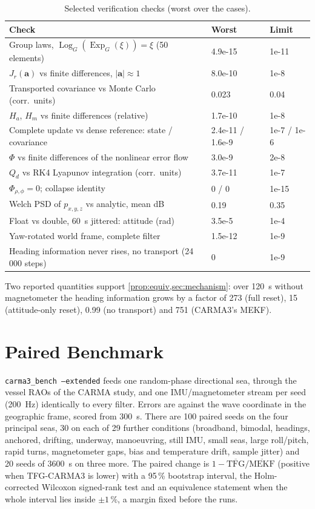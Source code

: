 \documentclass[conference]{IEEEtran}
\DeclareMathOperator{\Exp}{Exp}
\DeclareMathOperator{\Log}{Log}
\theoremstyle{bodysmall}
\begin{document}
\begin{table}[t]
  \centering
  \caption{Selected verification checks (worst over the cases).}
  \label{tab:verify}
  \footnotesize
  \setlength{\tabcolsep}{3pt}
  \begin{tabular}{@{}p{}ll@{}}
    \toprule
    Check & Worst & Limit\\
    \midrule
    Group laws, $\Log_G(\Exp_G(\xi))=\xi$ (50 elements) & 4.9e-15 & 1e-11\\
    $J_r(\mathbf a)$ vs finite differences, $|\mathbf a|\approx1$ & 8.0e-10 & 1e-8\\
    Transported covariance vs Monte Carlo (corr.\ units) & 0.023 & 0.04\\
    $H_a$, $H_m$ vs finite differences (relative) & 1.7e-10 & 1e-8\\
    Complete update vs dense reference: state / covariance & 2.4e-11 / 1.6e-9 & 1e-7 / 1e-6\\
    $\Phi$ vs finite differences of the nonlinear error flow & 3.0e-9 & 2e-8\\
    $Q_d$ vs RK4 Lyapunov integration (corr.\ units) & 3.7e-11 & 1e-7\\
    $\Phi_{\rho,\phi}=0$; collapse identity & 0 / 0 & 1e-15\\
    Welch PSD of $p_{x,y,z}$ vs analytic, mean dB & 0.19 & 0.35\\
    Float vs double, \SI{60}{s} jittered: attitude (rad) & 3.5e-5 & 1e-4\\
    Yaw-rotated world frame, complete filter & 1.5e-12 & 1e-9\\
    Heading information never rises, no transport (24\,000 steps) & 0 & 1e-9\\
    \bottomrule
  \end{tabular}
\end{table}

Two reported quantities support \cref{prop:equiv,sec:mechanism}: over
\SI{120}{s} without magnetometer the heading information grows by a factor of
273 (full reset), 15 (attitude-only reset), 0.99 (no transport) and 751
(CARMA3's MEKF).

\section{Paired Benchmark}
\label{sec:bench}
\texttt{carma3\_bench --extended} feeds one random-phase directional sea,
through the vessel RAOs of the CARMA study, and one IMU/magnetometer stream per
seed (\SI{200}{Hz}) identically to every filter. Errors are against the wave
coordinate in the geographic frame, scored from \SI{300}{s}. There are 100
paired seeds on the four principal seas, 30 on each of 29 further conditions
(broadband, bimodal, headings, anchored, drifting, underway, manoeuvring,
still IMU, small seas, large roll/pitch, rapid turns, magnetometer gaps, bias
and temperature drift, sample jitter) and 20 seeds of \SI{3600}{s} on three
more. The paired change is $1-\overline{\mathrm{TFG}}/\overline{\mathrm{MEKF}}$
(positive when TFG-CARMA3 is lower) with a 95\,\% bootstrap interval, the
Holm-corrected Wilcoxon signed-rank test and an equivalence statement when the
whole interval lies inside $\pm1\,\%$, a margin fixed before the runs.
\end{document}
